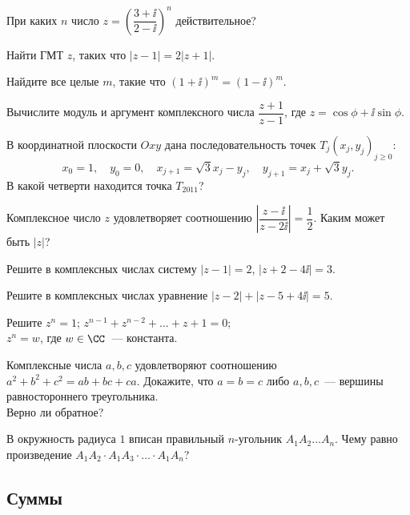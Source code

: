 \begin{problems}
\item
При каких $n$ число
\(
    z
=
    \left(
        \dfrac{3 + \ii}{2 - \ii}
    \right)^n
\)
действительное?

\item
Найти ГМТ $z$, таких что $|z - 1| = 2 |z + 1|$.

\item
Найдите все целые $m$, такие что $(1 + \ii)^m = (1 - \ii)^m$.

\item
Вычислите модуль и аргумент комплексного числа
$\dfrac{z + 1}{z - 1}$,
где
$z = \cos \phi + \ii \sin \phi$.

\item
В координатной плоскости $O x y$ дана последовательность точек
$T_j(x_j, y_j)_{j \geq 0}$:
\[
    x_0 = 1
,\quad
    y_0 = 0
,\quad
    x_{j + 1} = \sqrt{3} x_j - y_j
,\quad
    y_{j + 1} = x_j + \sqrt{3} y_j
.\]
В какой четверти находится точка $T_{2011}$?

\item
Комплексное число $z$ удовлетворяет соотношению
\(
    \left|
        \dfrac{z - \ii}{z - 2 \ii}
    \right|
=
    \dfrac{1}{2}
\). 
Каким может быть $|z|$?

\item
Решите в комплексных числах систему
$|z - 1| = 2$,
$|z + 2 - 4 \ii| = 3$.

\item
Решите в комплексных числах уравнение
$|z - 2| + |z - 5 + 4 \ii| = 5$.

\item
Решите
\quad
\sbp $z^n = 1$;
\quad
\sbp $z^{n - 1} + z^{n - 2} + \ldots + z + 1 = 0$;
\\
\sbp $z^n = w$, где $w \in \CC$~--- константа.

\item
Комплексные числа $a, b, c$ удовлетворяют соотношению
$a^2 + b^2 + c^2 = a b + b c + c a$.
Докажите, что $a = b = c$ либо $a, b, c$~--- вершины равностороннего
треугольника.
\\Верно ли обратное?

\item
В окружность радиуса $1$ вписан правильный $n$-угольник
$A_1 A_2 \ldots A_n$.
Чему равно произведение
$A_1 A_2 \cdot A_1 A_3 \cdot \ldots \cdot A_1 A_n$?

\end{problems}


\subsection*{Суммы}

